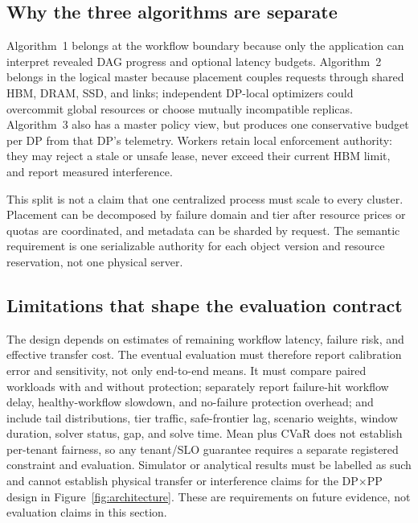 \subsection{Why the three algorithms are separate}

Algorithm~1 belongs at the workflow boundary because only the application can
interpret revealed DAG progress and optional latency budgets.  Algorithm~2 belongs in the logical
master because placement couples requests through shared HBM, DRAM, SSD, and
links; independent DP-local optimizers could overcommit global resources or
choose mutually incompatible replicas.  Algorithm~3 also has a master policy
view, but produces one conservative budget per DP from that DP's telemetry.
Workers retain local enforcement authority: they may reject a stale or unsafe
lease, never exceed their current HBM limit, and report measured interference.

This split is not a claim that one centralized process must scale to every
cluster.  Placement can be decomposed by failure domain and tier after resource
prices or quotas are coordinated, and metadata can be sharded by request.  The
semantic requirement is one serializable authority for each object version and
resource reservation, not one physical server.

\subsection{Limitations that shape the evaluation contract}

The design depends on estimates of remaining workflow latency, failure risk,
and effective transfer cost.  The eventual evaluation must therefore report
calibration error and sensitivity, not only end-to-end means.  It must compare
paired workloads with and without protection; separately report failure-hit
workflow delay, healthy-workflow slowdown, and no-failure protection overhead;
and include tail distributions, tier traffic, safe-frontier lag, scenario
weights, window duration, solver status, gap, and solve time.  Mean plus CVaR
does not establish per-tenant fairness, so any tenant/SLO guarantee requires a
separate registered constraint and evaluation.  Simulator or analytical
results must be labelled as such and cannot establish physical transfer or
interference claims for the DP$\times$PP design in
Figure~\ref{fig:architecture}.  These are requirements on future evidence, not
evaluation claims in this section.
